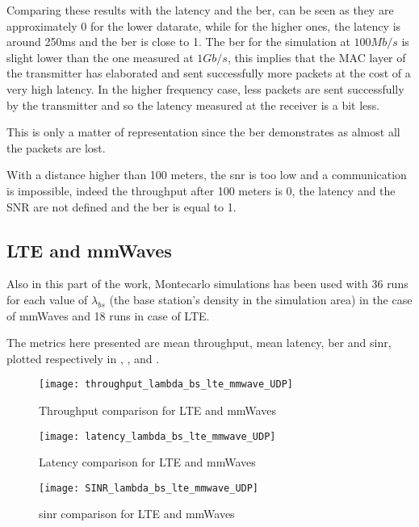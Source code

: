 Comparing these results with the latency and the \gls{ber}, can be seen as they are approximately 0 for the lower datarate, while for the higher ones, the latency is around 250ms and the \gls{ber} is close to 1. The \gls{ber} for the simulation at $100Mb/s$ is slight lower than the one measured at $1Gb/s$, this implies that the MAC layer of the transmitter has elaborated and sent successfully more packets at the cost of a very high latency. In the higher frequency case, less packets are sent successfully by the transmitter and so the latency measured at the receiver is a bit less.

This is only a matter of representation since the \gls{ber} demonstrates as almost all the packets are lost.

With a distance higher than 100 meters, the \gls{snr} is too low and a communication is impossible, indeed the throughput after 100 meters is 0, the latency and the SNR are not defined and the \gls{ber} is equal to 1.

\subsection{LTE and mmWaves}

Also in this part of the work, Montecarlo simulations has been used with 36 runs for each value of $\lambda_{bs}$ (the base station's density in the simulation area) in the case of \gls{mmWaves} and 18 runs in case of LTE.

The metrics here presented are mean throughput, mean latency, \gls{ber} and \gls{sinr}, plotted respectively in , ,  and .

\begin{figure}[ht]
  \texttt{[image: throughput\_lambda\_bs\_lte\_mmwave\_UDP]}
  \caption{Throughput comparison for LTE and mmWaves}
  \label{fig:mmWaves-throughput}
\end{figure}

\begin{figure}[ht]
  \texttt{[image: latency\_lambda\_bs\_lte\_mmwave\_UDP]}
  \caption{Latency comparison for LTE and mmWaves}
  \label{fig:mmWaves-latency}
\end{figure}

\begin{figure}[ht]
  \texttt{[image: SINR\_lambda\_bs\_lte\_mmwave\_UDP]}
  \caption{\gls{sinr} comparison for LTE and mmWaves}
  \label{fig:mmWaves-SINR}
\end{figure}

